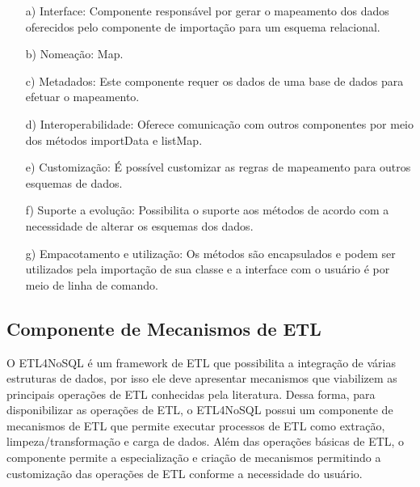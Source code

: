 \begin{itemize}
	\item[a)] Interface: Componente responsável por gerar o mapeamento dos dados oferecidos pelo componente de importação para um esquema relacional.
	
	\item[b)] Nomeação: Map.
	
	\item[c)] Metadados: Este componente requer os dados de uma base de dados para efetuar o mapeamento.
	
	\item[d)] Interoperabilidade: Oferece comunicação com outros componentes por meio dos métodos importData e listMap.
	
	
	
	\item[e)] Customização: É possível customizar as regras de mapeamento para outros esquemas de dados.
	
	\item[f)] Suporte a evolução: Possibilita o suporte aos métodos de acordo com a necessidade de alterar os esquemas dos dados.
	
	\item[g)] Empacotamento e utilização: Os métodos são encapsulados e podem  ser utilizados pela importação de sua classe e a interface com o usuário é por meio de linha de comando.
	
\end{itemize}


\subsection{Componente de Mecanismos de ETL}

O ETL4NoSQL é um framework de ETL que possibilita a integração de várias estruturas de dados, por isso ele deve apresentar mecanismos que viabilizem as principais operações de ETL conhecidas pela literatura. Dessa forma, para disponibilizar as operações de ETL, o ETL4NoSQL possui um componente de mecanismos de ETL que permite executar processos de ETL como extração, limpeza/transformação e carga de dados. Além das operações básicas de ETL, o componente permite a especialização e criação de mecanismos permitindo a customização das operações de ETL conforme a necessidade do usuário.


